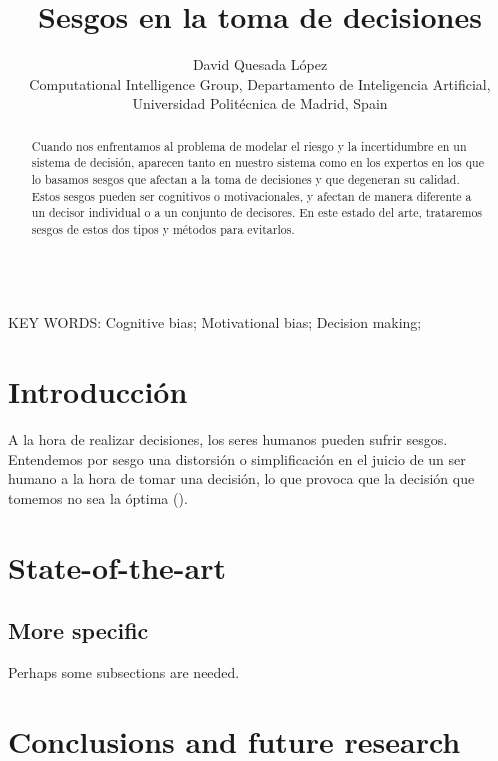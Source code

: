 \documentclass[a4paper,11pt]{article}
\begin{document}
\title{Sesgos en la toma de decisiones}

\author{{David Quesada López}\\
{\small Computational Intelligence Group, Departamento de Inteligencia Artificial, Universidad Polit\'ecnica de Madrid, Spain}}

\date{}
\maketitle



\begin{abstract} 
Cuando nos enfrentamos al problema de modelar el riesgo y la incertidumbre en un sistema de decisión, aparecen tanto en nuestro sistema como en los expertos en los que lo basamos sesgos que afectan a la toma de decisiones y que degeneran su calidad. Estos sesgos pueden ser cognitivos o motivacionales, y afectan de manera diferente a un decisor individual o a un conjunto de decisores. En este estado del arte, trataremos sesgos de estos dos tipos y métodos para evitarlos.
\end{abstract}


\ \\
KEY WORDS: Cognitive bias; Motivational bias; Decision making;




\section{Introducción}

A la hora de realizar decisiones, los seres humanos pueden sufrir sesgos. Entendemos por sesgo una distorsión o simplificación en el juicio de un ser humano a la hora de tomar una decisión, lo que provoca que la decisión que tomemos no sea la óptima (\cite{toet2016}).



\section{State-of-the-art}


\subsection{More specific}


Perhaps some subsections are needed.

\section{Conclusions and future research}
\end{document}
